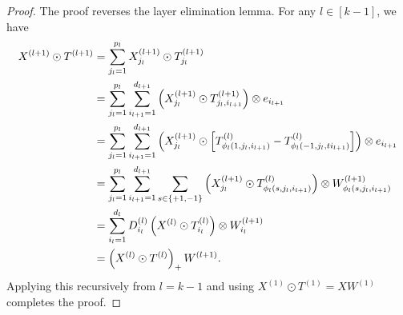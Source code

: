 \tensorSolutionMapping*
\begin{proof}
    The proof reverses the layer elimination lemma.
    For any \( l \in [k-1] \), we have
    \begin{align*}
        X^{(l+1)} \odot T^{(l+1)}
         & = \sum_{j_{l}=1}^{p_l} X^{(l+1)}_{j_{l}} \odot T^{(l+1)}_{j_{l}}                \\
         & = \sum_{j_{l}=1}^{p_l} \sum_{i_{l+1}=1}^{d_{l+1}}
        \left(X^{(l+1)}_{j_{l}} \odot T^{(l+1)}_{j_{l}, i_{l+1}}\right) \otimes e_{i_{l+1}}       \\
         & = \sum_{j_{l}=1}^{p_l} \sum_{i_{l+1}=1}^{d_{l+1}}
        \left(X^{(l+1)}_{j_{l}} \odot
        \left[T^{(l)}_{\phi_l(1, j_{l}, i_{l+1})} - T^{(l)}_{\phi_l(-1, j_{l}, t i_{l+1})}\right]\right)
        \otimes e_{i_{l+1}}                                                                \\
         & = \sum_{j_{l}=1}^{p_l} \sum_{i_{l+1}=1}^{d_{l+1}} \sum_{s \in \left\{+1, -1\right\}}
        \left(X^{(l+1)}_{j_{l}} \odot
        T^{(l)}_{\phi_l(s, j_{l}, i_{l+1})}\right) \otimes W^{(l+1)}_{\phi_l(s, j_{l}, i_{l+1})} \\
         & = \sum_{i_{l}=1}^{d_{l}}
        D^{(l)}_{i_{l}} \left(X^{(l)} \odot
        T^{(l)}_{i_{l}}\right) \otimes W^{(l+1)}_{i_{l}}                                         \\
         & = \left(X^{(l)} \odot T^{(l)}\right)_+ W^{(l+1)}.
    \end{align*}
    Applying this recursively from \( l = k - 1 \)
    and using \( X^{(1)} \odot T^{(1)} = X W^{(1)} \) completes the proof.
\end{proof}

